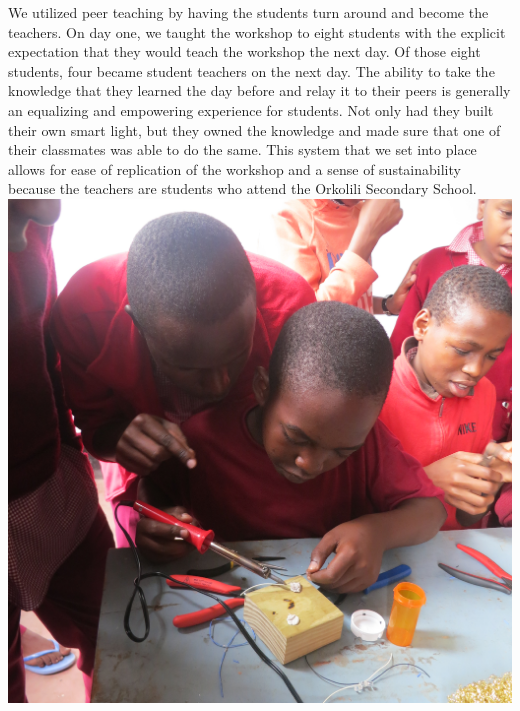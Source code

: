 \documentclass[11pt, twocolumn]{article}
\begin{document}
We utilized peer teaching by having the students turn around and become the teachers.  On day one, we taught the workshop to eight students with the explicit expectation that they would teach the workshop the next day. Of those eight students, four became student teachers on the next day. The ability to take the knowledge that they learned the day before and relay it to their peers is generally an equalizing and empowering experience for students. Not only had they built their own smart light, but they owned the knowledge and made sure that one of their classmates was able to do the same. This system that we set into place allows for ease of replication of the workshop and a sense of sustainability because the teachers are students who attend the Orkolili Secondary School.
\includegraphics[width=\columnwidth]{teachers.jpg}\\
\end{document}
